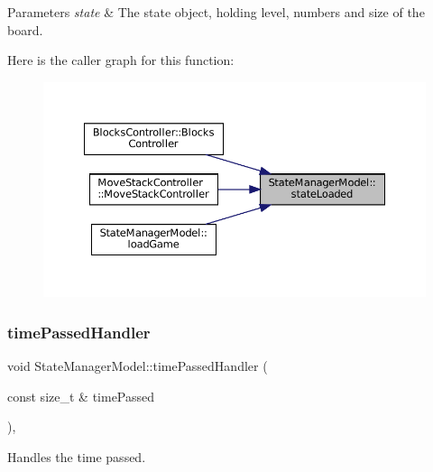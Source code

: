 \begin{DoxyParams}{Parameters}
{\em state} & The state object, holding level, numbers and size of the board. \\
\hline
\end{DoxyParams}
Here is the caller graph for this function\+:
\nopagebreak
\begin{figure}[H]
\begin{center}
\leavevmode
\includegraphics[width=350pt]{class_state_manager_model_ade47748f618f84b0a2a32be1da177ad5_icgraph}
\end{center}
\end{figure}
\mbox{\label{class_state_manager_model_ab3f4c9b1d44a75c63c034e79f88ee9f0}} 
\subsubsection{\texorpdfstring{timePassedHandler}{timePassedHandler}}
{\footnotesize\ttfamily void State\+Manager\+Model\+::time\+Passed\+Handler (\begin{DoxyParamCaption}\item[{const size\+\_\+t \&}]{time\+Passed }\end{DoxyParamCaption})\hspace{0.3cm}{\ttfamily [inline]}, {\ttfamily [slot]}}



Handles the time passed. 


